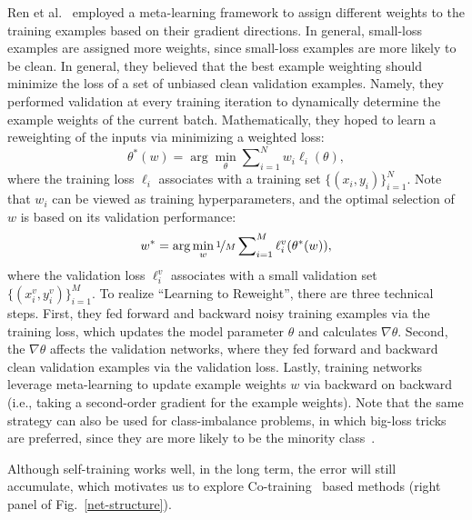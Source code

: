 Ren et al.~ employed a meta-learning framework to assign different weights to the training examples based on their gradient directions. In general,  small-loss examples are assigned  more weights, since small-loss examples are more likely to be clean. In general, they believed that the best example weighting should minimize the loss of a set of unbiased clean validation examples. Namely, they performed validation at every training iteration to dynamically determine the example weights of the current batch. Mathematically, they hoped to learn a reweighting of the inputs via minimizing a weighted loss:
\begin{equation}
\theta^*(w) = \arg\min_{\theta}
\sum\nolimits_{i=1}^N w_i \ell_i(\theta),
\end{equation}
where the training loss $\ell_i$ associates with a training set
$\{(x_i,y_i)\}_{i=1}^N$. Note that $w_i$ can be viewed as training hyperparameters, and the optimal selection of $w$ is based on its validation performance: 
\begin{equation}
w^* = \arg\min_{w}\nicefrac{1}{M}
\sum\nolimits_{i=1}^M \ell_i^v(\theta^*(w)),
\end{equation}
where the validation loss $\ell_i^v$ associates with a small validation set $\{(x_i^v,y_i^v)\}_{i=1}^M$. To realize ``Learning to Reweight'', there are three technical steps. First, they fed forward and backward noisy training examples via the training loss, which updates the model parameter $\theta$ and calculates $\nabla\theta$. Second, the $\nabla\theta$ affects the validation networks, where they fed forward and backward clean validation examples via the validation loss. Lastly, training networks leverage meta-learning to update example weights $w$ via backward on backward (i.e., taking a second-order gradient for the example weights). Note that the same strategy can also be  used for class-imbalance problems, in which big-loss tricks are preferred, since they are more likely to be the minority class~.

Although self-training works well, in the long term, the error will still accumulate, which motivates us to explore Co-training~ based methods (right panel of Fig.~\ref{net-structure}).

